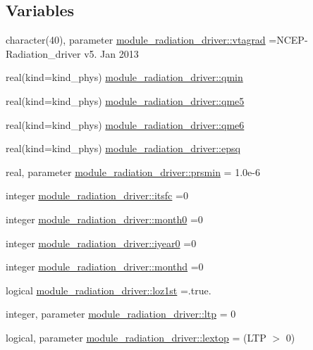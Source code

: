 \subsection*{Variables}
\begin{DoxyCompactItemize}
\item 
character(40), parameter \hyperlink{namespacemodule__radiation__driver_a70a36595385cf1f5794f9c5859e52ab6}{module\+\_\+radiation\+\_\+driver\+::vtagrad} =\textquotesingle{}N\+C\+EP-\/Radiation\+\_\+driver v5. Jan 2013 \textquotesingle{}
\item 
real(kind=kind\+\_\+phys) \hyperlink{namespacemodule__radiation__driver_afdc2a7e1dbfb075ac33a2388564d9428}{module\+\_\+radiation\+\_\+driver\+::qmin}
\item 
real(kind=kind\+\_\+phys) \hyperlink{namespacemodule__radiation__driver_ab671cb80142c71dab5f41f01ccdcc088}{module\+\_\+radiation\+\_\+driver\+::qme5}
\item 
real(kind=kind\+\_\+phys) \hyperlink{namespacemodule__radiation__driver_a4916e37c472b2f824b6f566ff67200cd}{module\+\_\+radiation\+\_\+driver\+::qme6}
\item 
real(kind=kind\+\_\+phys) \hyperlink{namespacemodule__radiation__driver_a0b0bf0fa8723b80d0891ec3327d187d7}{module\+\_\+radiation\+\_\+driver\+::epsq}
\item 
real, parameter \hyperlink{namespacemodule__radiation__driver_a3fc43ca0d2c5f69a380ddb4f0926ecc7}{module\+\_\+radiation\+\_\+driver\+::prsmin} = 1.\+0e-\/6
\item 
integer \hyperlink{namespacemodule__radiation__driver_a9ee6a89464bf206cc07ea30d7eeaaeb8}{module\+\_\+radiation\+\_\+driver\+::itsfc} =0
\item 
integer \hyperlink{namespacemodule__radiation__driver_a6eb268f296c77047f389ed6fac5f95be}{module\+\_\+radiation\+\_\+driver\+::month0} =0
\item 
integer \hyperlink{namespacemodule__radiation__driver_a4d755de48d0aa83f337a2a907ac7d8a2}{module\+\_\+radiation\+\_\+driver\+::iyear0} =0
\item 
integer \hyperlink{namespacemodule__radiation__driver_ac4baf8ff048aaa5b85d03cc42c579c7b}{module\+\_\+radiation\+\_\+driver\+::monthd} =0
\item 
logical \hyperlink{namespacemodule__radiation__driver_af6e0e1ef2ebb78f57c897ebaf633edd2}{module\+\_\+radiation\+\_\+driver\+::loz1st} =.true.
\item 
integer, parameter \hyperlink{namespacemodule__radiation__driver_aab2535e9906afd709124056f4ca1e470}{module\+\_\+radiation\+\_\+driver\+::ltp} = 0
\item 
logical, parameter \hyperlink{namespacemodule__radiation__driver_ad27b36d0186c8147fe839eb5c268d157}{module\+\_\+radiation\+\_\+driver\+::lextop} = (L\+TP $>$ 0)
\end{DoxyCompactItemize}
